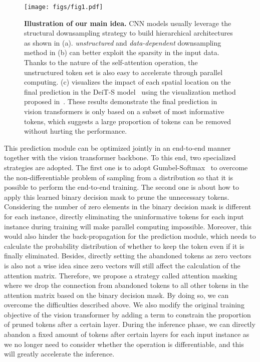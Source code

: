 \documentclass{article}
\begin{document}
\begin{figure}[t]
    \centering
    \texttt{[image: figs/fig1.pdf]}
    \caption{\textbf{Illustration of our main idea.} CNN models usually leverage the structural downsampling strategy to build hierarchical architectures as shown in (a). \emph{unstructured} and \emph{data-dependent} downsampling method in (b) can better exploit the sparsity in the input data. Thanks to the nature of the self-attention operation, the unstructured token set is also easy to accelerate through parallel computing. (c) visualizes the impact of each spatial location on the final prediction in the DeiT-S model~\cite{touvron2020deit} using the visualization method proposed in~\cite{chefer2020transformer}. These results demonstrate the final prediction in vision transformers is only based on a subset of most informative tokens, which suggests a large proportion of tokens can be removed without hurting the performance.} \vspace{-10pt}
    \label{fig:idea}
\end{figure}

This prediction module can be optimized jointly in an end-to-end manner together with the vision transformer backbone. To this end, two specialized strategies are adopted. The first one is to adopt Gumbel-Softmax~\cite{eric2017gumbel} to overcome the non-differentiable problem of sampling from a distribution so that it is possible to perform the end-to-end training. The second one is about how to apply this learned binary decision mask to prune the unnecessary tokens. Considering the number of zero elements in the binary decision mask is different for each instance, directly eliminating the uninformative tokens for each input instance during training will make parallel computing impossible. Moreover, this would also hinder the back-propagation for the prediction module, which needs to calculate the probability distribution of whether to keep the token even if it is finally eliminated. Besides, directly setting the abandoned tokens as zero vectors is also not a wise idea since zero vectors will still affect the calculation of the attention matrix. Therefore, we propose a strategy called attention masking where we drop the connection from abandoned tokens to all other tokens in the attention matrix based on the binary decision mask. By doing so, we can overcome the difficulties described above. We also modify the original training objective of the vision transformer by adding a term to constrain the proportion of pruned tokens after a certain layer. During the inference phase, we can directly abandon a fixed amount of tokens after certain layers for each input instance as we no longer need to consider whether the operation is differentiable, and this will greatly accelerate the inference.
\end{document}
